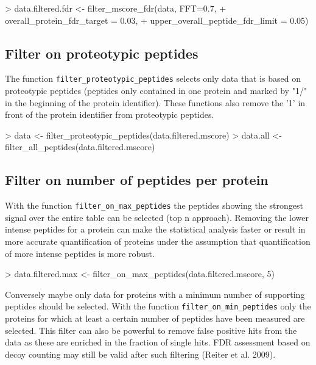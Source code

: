 \documentclass[a4paper]{article}
\begin{document}
\begin{Schunk}
\begin{Sinput}
> data.filtered.fdr <- filter_mscore_fdr(data, FFT=0.7,
+                                    overall_protein_fdr_target = 0.03,
+                                    upper_overall_peptide_fdr_limit = 0.05)
\end{Sinput}
\end{Schunk}

\subsection{Filter on proteotypic peptides}
The function \texttt{filter\_proteotypic\_peptides} selects only data that is based on proteotypic peptides (peptides only contained in one protein and marked by "1/" in the beginning of the protein identifier). These functions also remove the '1' in front of the protein identifier from proteotypic peptides.

\begin{Schunk}
\begin{Sinput}
> data <- filter_proteotypic_peptides(data.filtered.mscore)
> data.all <- filter_all_peptides(data.filtered.mscore)
\end{Sinput}
\end{Schunk}

\subsection{Filter on number of peptides per protein}
With the function \texttt{filter\_on\_max\_peptides} the peptides showing the strongest signal over the entire table can be selected (top n approach). Removing the lower intense peptides for a protein can make the statistical analysis faster or result in more accurate quantification of proteins under the assumption that quantification of more intense peptides is more robust.

\begin{Schunk}
\begin{Sinput}
> data.filtered.max <- filter_on_max_peptides(data.filtered.mscore, 5)
\end{Sinput}
\end{Schunk}

Conversely maybe only data for proteins with a minimum number of supporting peptides should be selected. With the function \texttt{filter\_on\_min\_peptides} only the proteins for which at least a certain number of peptides have been measured are selected. This filter can also be powerful to remove false positive hits from the data as these are enriched in the fraction of single hits. FDR assessment based on decoy counting may still be valid after such filtering (Reiter et al. 2009).
\end{document}
